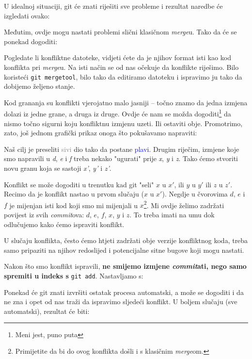 U idealnoj situaciji, git će znati riješiti sve probleme i rezultat naredbe će izgledati ovako:



Međutim, ovdje mogu nastati problemi slični klasičnom \emph{merge}u.
Tako da će se ponekad dogoditi:



Pogledate li konfliktne datoteke, vidjeti ćete da je njihov format isti kao kod konflikta pri \emph{merge}u.
Na isti način se od nas očekuje da konflikte riješimo.
Bilo koristeći \verb+git mergetool+, bilo tako da editiramo datoteku i ispravimo ju tako da dobijemo željeno stanje.

Kod grananja su konflikti vjerojatno malo jasniji -- točno znamo da jedna izmjena dolazi iz jedne grane, a druga iz druge.
Ovdje će nam se možda dogoditi\footnote{Meni jest, puno puta} da nismo točno sigurni koju konfliktnu izmjenu uzeti.
Ili ostaviti obje.
Promotrimo, zato, još jednom grafički prikaz onoga što pokušavamo napraviti:



Naš cilj je preseliti \textcolor{gray}{sivi} dio tako da postane \textcolor{blue}{plavi}.
Drugim riječim, izmjene koje smo napravili u \emph d, \emph e i \emph f treba nekako "ugurati" prije \emph x, \emph y i \emph z.
Tako ćemo stvoriti novu granu koja se sastoji \emph{x'}, \emph{y'} i \emph{z'}.

Konflikt se može dogoditi u trenutku kad git "seli" $x$ u $x'$, ili $y$ u $y'$ ili $z$ u $z'$.
Recimo da je konflikt nastao u prvom slučaju ($x$ u $x'$).
Negdje u čvorovima $d$, $e$ i $f$ je mijenjan isti kod koji smo mi mijenjali u $x$\footnote{Primijetite da bi do ovog konflikta došli i s klasičnim \emph{merge}om.}.
Mi ovdje želimo zadržati povijest iz svih \emph{commit}ova: $d$, $e$, $f$, $x$, $y$ i $z$.
To treba imati na umu dok odlučujemo kako ćemo ispraviti konflikt.

U slučaju konflikta, često ćemo htjeti zadržati obje verzije konfliktnog koda, treba samo pripaziti na njihov redoslijed i potencijalne sitne bugove koji mogu nastati.

Nakon što smo konflikt ispravili, \textbf{ne smijemo izmjene \emph{commit}ati, nego samo spremiti u indeks s} \verb+git add+.
Nastavljamo s:


Ponekad će git znati izvršiti ostatak procesa automatski, a može se dogoditi i da ne zna i opet od nas traži da ispravimo sljedeći konflikt.
U boljem slučaju (sve automatski), rezultat će biti:

